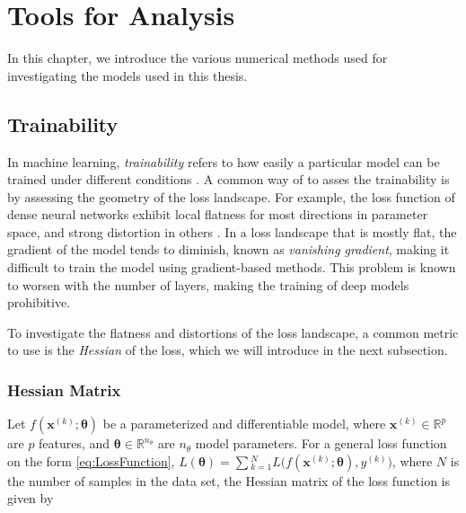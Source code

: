 \chapter{Tools for Analysis}\label{chap:TfA}
In this chapter, we introduce the various numerical methods used for investigating the models used in this thesis. 


\section{Trainability}\label{sec:Trainability}
In machine learning, \emph{trainability} refers to how easily a particular model can be trained under different conditions \cite{abbas2020power}. A common way of to asses the trainability is by assessing the geometry of the loss landscape. For example, the loss function of dense neural networks exhibit local flatness for most directions in parameter space, and strong distortion in others \cite{karakida2019universal}. In a loss landscape that is mostly flat, the gradient of the model tends to diminish, known as \emph{vanishing gradient}, making it difficult to train the model using gradient-based methods. This problem is known to worsen with the number of layers, making the training of deep models prohibitive.

To investigate the flatness and distortions of the loss landscape, a common metric to use is the \emph{Hessian} of the loss, which we will introduce in the next subsection. 
\subsection{Hessian Matrix}\label{sec:HessianMatrix}
Let $f(\boldsymbol{x}^{(k)}; \boldsymbol{\theta})$ be a parameterized and differentiable model, where $\boldsymbol{x}^{(k)} \in \mathbb{R}^p$ are $p$ features, and $\boldsymbol{\theta} \in \mathbb{R}^{n_\theta}$ are $n_{\theta}$ model parameters. For a general loss function on the form \cref{eq:LossFunction}, $L(\boldsymbol{\theta}) = \sum{_{k=1}^{N}L(f(\boldsymbol{x}^{(k)};\boldsymbol{\theta}), y^{(k)}})$, where $N$ is the number of samples in the data set, the Hessian matrix of the loss function is given by

